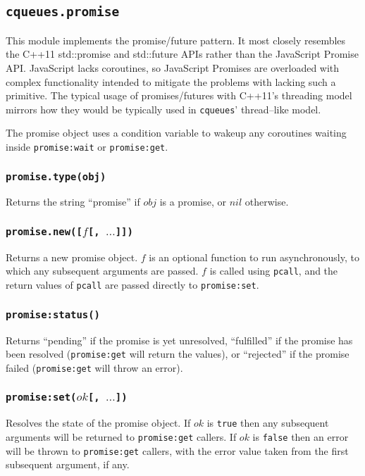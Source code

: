\documentclass[11pt, oneside]{memoir}
\newcommand*{\cqueues}[0]{\texttt{cqueues}\xspace}
\newcommand*{\fn}[1]{\texttt{#1}\xspace}
\newcommand*{\true}[0]{\texttt{true}\xspace}
\newcommand*{\false}[0]{\texttt{false}\xspace}
\newcounter{toccols}
\newenvironment{Module}[1]{
	\subsection{\texttt{#1}}
	\addtocontents{toc}{
		\protect\begin{multicols}{\value{toccols}}
	}
}{
	\addtocontents{toc}{\protect\end{multicols}}
}
\begin{document}
\begin{Module}{cqueues.promise}

This module implements the promise/future pattern. It most closely resembles the C++11 std::promise and std::future APIs rather than the JavaScript Promise API. JavaScript lacks coroutines, so JavaScript Promises are overloaded with complex functionality intended to mitigate the problems with lacking such a primitive. The typical usage of promises/futures with C++11's threading model mirrors how they would be typically used in \cqueues' thread--like model.

The promise object uses a condition variable to wakeup any coroutines waiting inside \fn{promise:wait} or \fn{promise:get}.

\subsubsection[\fn{promise.type}]{\fn{promise.type(obj)}}

Returns the string ``promise'' if $obj$ is a promise, or $nil$ otherwise.

\subsubsection[\fn{promise.new}]{\fn{promise.new([$f$[, $\ldots$]])}}

Returns a new promise object. $f$ is an optional function to run asynchronously, to which any subsequent arguments are passed. $f$ is called using \fn{pcall}, and the return values of \fn{pcall} are passed directly to \fn{promise:set}.

\subsubsection[\fn{promise:status}]{\fn{promise:status()}}

Returns ``pending'' if the promise is yet unresolved, ``fulfilled'' if the promise has been resolved (\fn{promise:get} will return the values), or ``rejected'' if the promise failed (\fn{promise:get} will throw an error).

\subsubsection[\fn{promise:set}]{\fn{promise:set($ok$[, $\ldots$])}}

Resolves the state of the promise object. If $ok$ is \true then any subsequent arguments will be returned to \fn{promise:get} callers. If $ok$ is \false then an error will be thrown to \fn{promise:get} callers, with the error value taken from the first subsequent argument, if any.


\end{Module}
\end{document}
